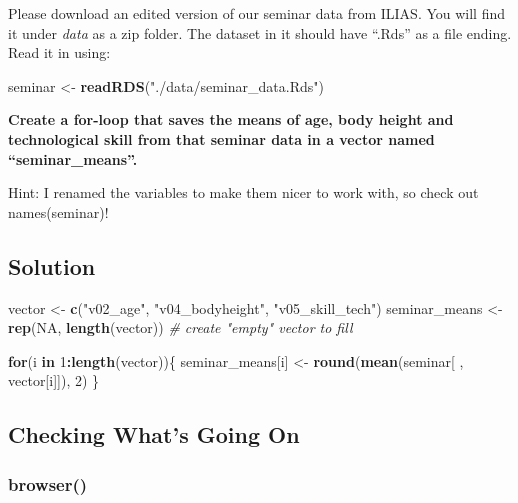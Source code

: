 \documentclass[
]{book}
\newenvironment{Shaded}{\begin{snugshade}}{\end{snugshade}}
\newcommand{\CommentTok}[1]{\textcolor[rgb]{0.56,0.35,0.01}{\textit{#1}}}
\newcommand{\ConstantTok}[1]{\textcolor[rgb]{0.56,0.35,0.01}{#1}}
\newcommand{\ControlFlowTok}[1]{\textcolor[rgb]{0.13,0.29,0.53}{\textbf{#1}}}
\newcommand{\DecValTok}[1]{\textcolor[rgb]{0.00,0.00,0.81}{#1}}
\newcommand{\FunctionTok}[1]{\textcolor[rgb]{0.13,0.29,0.53}{\textbf{#1}}}
\newcommand{\NormalTok}[1]{#1}
\newcommand{\OtherTok}[1]{\textcolor[rgb]{0.56,0.35,0.01}{#1}}
\newcommand{\SpecialCharTok}[1]{\textcolor[rgb]{0.81,0.36,0.00}{\textbf{#1}}}
\newcommand{\StringTok}[1]{\textcolor[rgb]{0.31,0.60,0.02}{#1}}
\begin{document}
Please download an edited version of our seminar data from ILIAS. You will find it under \emph{data} as a zip folder. The dataset in it should have ``.Rds'' as a file ending. Read it in using:

\begin{Shaded}
\begin{Highlighting}[]
\NormalTok{seminar }\OtherTok{\textless{}{-}} \FunctionTok{readRDS}\NormalTok{(}\StringTok{"./data/seminar\_data.Rds"}\NormalTok{)}
\end{Highlighting}
\end{Shaded}

\textbf{Create a for-loop that saves the means of age, body height and technological skill from that seminar data in a vector named ``seminar\_means''.}

Hint: I renamed the variables to make them nicer to work with, so check out names(seminar)!

\subsection{Solution}\label{solution-7}

\begin{Shaded}
\begin{Highlighting}[]
\NormalTok{vector }\OtherTok{\textless{}{-}} \FunctionTok{c}\NormalTok{(}\StringTok{"v02\_age"}\NormalTok{, }\StringTok{"v04\_bodyheight"}\NormalTok{, }\StringTok{"v05\_skill\_tech"}\NormalTok{)}
\NormalTok{seminar\_means }\OtherTok{\textless{}{-}} \FunctionTok{rep}\NormalTok{(}\ConstantTok{NA}\NormalTok{, }\FunctionTok{length}\NormalTok{(vector)) }\CommentTok{\# create "empty" vector to fill}

\ControlFlowTok{for}\NormalTok{(i }\ControlFlowTok{in} \DecValTok{1}\SpecialCharTok{:}\FunctionTok{length}\NormalTok{(vector))\{}
\NormalTok{  seminar\_means[i] }\OtherTok{\textless{}{-}} \FunctionTok{round}\NormalTok{(}\FunctionTok{mean}\NormalTok{(seminar[ , vector[i]]), }\DecValTok{2}\NormalTok{)}
\NormalTok{\}}
\end{Highlighting}
\end{Shaded}

\subsection{Checking What's Going On}\label{checking-whats-going-on}

\subsubsection{browser()}\label{browser}
\end{document}
